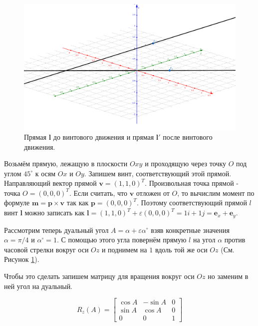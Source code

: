 \documentclass[%
]{ittmm}
\begin{document}
\begin{figure}[h!]
  \centering
  \includegraphics[width=1\textwidth]{Screw_Motion_example(1).png} %
  \caption{Прямая $\mathbf{l}$ до винтового движения и прямая $\mathbf{l}'$ после винтового движения.}
  \label{fig:example}
  \end{figure}

Возьмём прямую, лежащую в плоскости $Oxy$ и проходящую через точку $O$ под углом $45^\circ$ к осям $Ox$ и $Oy$. Запишем винт, соответствующий этой прямой.
Направляющий вектор прямой $\mathbf{v}=(1,1,0)^T$. Произвольная точка прямой - точка $O=(0,0,0)^T$. Если считать, что $\mathbf{v}$ отложен от $O$, то вычислим
момент по формуле $\mathbf{m} = \mathbf{p} \times \mathbf{v}$ так как $\mathbf{p}=(0,0,0)^T$. Поэтому соответствующий прямой $l$ винт $\mathbf{l}$ можно записать как
$\mathbf{l} = (1,1,0)^T + \varepsilon (0,0,0)^T = 1 i + 1 j = \mathbf{e}_x + \mathbf{e}_y$.

Рассмотрим теперь дуальный угол $A=\alpha+\varepsilon \alpha^\circ$ взяв конкретные значения $\alpha=\pi/4$ и $\alpha^\circ=1$. С помощью этого угла повернём прямую $l$
на угол $\alpha$ против часовой стрелки вокруг оси $Oz$ и поднимем на $1$ вдоль той же оси $Oz$ (См. Рисунок \ref{fig:example}).

Чтобы это сделать запишем матрицу для вращения вокруг оси $Oz$ но заменим в ней угол на дуальный.

\begin{equation*}
  R_z(A)=
  \begin{bmatrix}
    \cos A & -\sin A & 0 \\
    \sin A & \cos A & 0 \\
    0 & 0 & 1
  \end{bmatrix}
\end{equation*}
\end{document}
